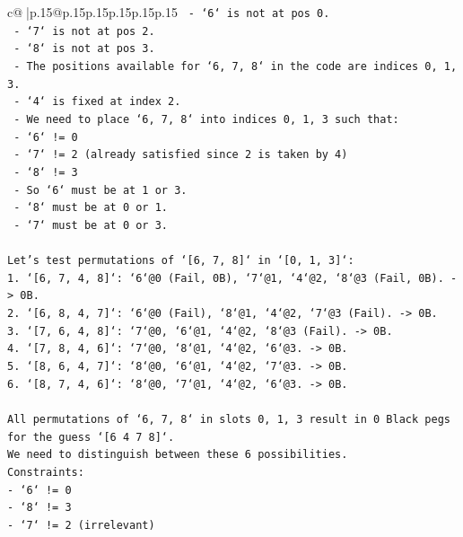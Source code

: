 \documentclass{article}
\begin{document}
{\begin{supertabular}{c@{$\;$}|p{.15\linewidth}@{}p{.15\linewidth}p{.15\linewidth}p{.15\linewidth}p{.15\linewidth}p{.15\linewidth}}
{{{\texttt{        {-} `6` is not at pos 0.} \\
\texttt{        {-} `7` is not at pos 2.} \\
\texttt{        {-} `8` is not at pos 3.} \\
\texttt{    {-} The positions available for `6, 7, 8` in the code are indices 0, 1, 3.} \\
\texttt{    {-} `4` is fixed at index 2.} \\
\texttt{    {-} We need to place `6, 7, 8` into indices 0, 1, 3 such that:} \\
\texttt{        {-} `6` != 0} \\
\texttt{        {-} `7` != 2 (already satisfied since 2 is taken by 4)} \\
\texttt{        {-} `8` != 3} \\
\texttt{    {-} So `6` must be at 1 or 3.} \\
\texttt{    {-} `8` must be at 0 or 1.} \\
\texttt{    {-} `7` must be at 0 or 3.} \\
\\ 
\texttt{Let's test permutations of `{[}6, 7, 8{]}` in `{[}0, 1, 3{]}`:} \\
\texttt{1.  `{[}6, 7, 4, 8{]}`: `6`@0 (Fail, 0B), `7`@1, `4`@2, `8`@3 (Fail, 0B). {-}> 0B.} \\
\texttt{2.  `{[}6, 8, 4, 7{]}`: `6`@0 (Fail), `8`@1, `4`@2, `7`@3 (Fail). {-}> 0B.} \\
\texttt{3.  `{[}7, 6, 4, 8{]}`: `7`@0, `6`@1, `4`@2, `8`@3 (Fail). {-}> 0B.} \\
\texttt{4.  `{[}7, 8, 4, 6{]}`: `7`@0, `8`@1, `4`@2, `6`@3. {-}> 0B.} \\
\texttt{5.  `{[}8, 6, 4, 7{]}`: `8`@0, `6`@1, `4`@2, `7`@3. {-}> 0B.} \\
\texttt{6.  `{[}8, 7, 4, 6{]}`: `8`@0, `7`@1, `4`@2, `6`@3. {-}> 0B.} \\
\\ 
\texttt{All permutations of `6, 7, 8` in slots 0, 1, 3 result in 0 Black pegs for the guess `{[}6 4 7 8{]}`.} \\
\texttt{We need to distinguish between these 6 possibilities.} \\
\texttt{Constraints:} \\
\texttt{{-} `6` != 0} \\
\texttt{{-} `8` != 3} \\
\texttt{{-} `7` != 2 (irrelevant)} \\
\\ 
}}}
\end{supertabular}}
\end{document}
